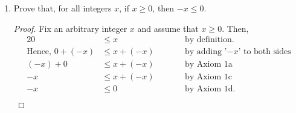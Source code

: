 \documentclass{article}
\begin{document}
\begin{enumerate}
\begin{enumerate}
    			\item There exists an integer $x$ such that, for all integers $y$, $x + y = 17$. \\\\
                    We must prove that: ``For all integers $x$, there exists an integer $y$ such that $x + y = 17$." Note that this was proved in (1f). 
                        \begin{proof}
                            Fix an arbitrary integer $x$. Let $y = (17 + (\minus x)) \in \mathbb{Z}$. Then, 
                            \begin{alignat*}{2}
                                x + y &= x + (17 + (\minus x)) \\
                                &= x + ((\minus x ) + 17)   &\qquad &\textrm{by Axiom 1a}   \\
                                &= (x + (\minus x)) + 17    &\qquad &\textrm{by Axiom 1b}   \\
                                &= 0 + 17                   &\qquad &\textrm{by Axiom 1d}   \\
                                &= 17                       &\qquad &\textrm{by Axiom 1c.}  
                            \end{alignat*}
                        \end{proof}
                        Since the negation was proven, the original statement must be false.

    		\end{enumerate}

    	\item Prove that, for all integers $x$, if $x \ge 0$, then $\minus x \le 0$.
                \begin{proof}
                    Fix an arbitrary integer $x$ and assume that $x \ge 0$. Then,
                    \begin{alignat*}{2}
                        0 &\le x                             &\qquad &\textrm{by definition.} \\
                        \textrm{Hence, } 0 + (\minus x) &\le x + (\minus x) &\qquad &\textrm{by adding '$\minus x$' to both sides}  \\
                        (\minus x) + 0 &\le x + (\minus x)  &\qquad &\textrm{by Axiom 1a}   \\
                        \minus x &\le x + (\minus x)        &\qquad &\textrm{by Axiom 1c}  \\
                        \minus x &\le 0                     &\qquad &\textrm{by Axiom 1d.}  \\
                    \end{alignat*}
                \end{proof}
     
    \end{enumerate}
    
\end{document}
